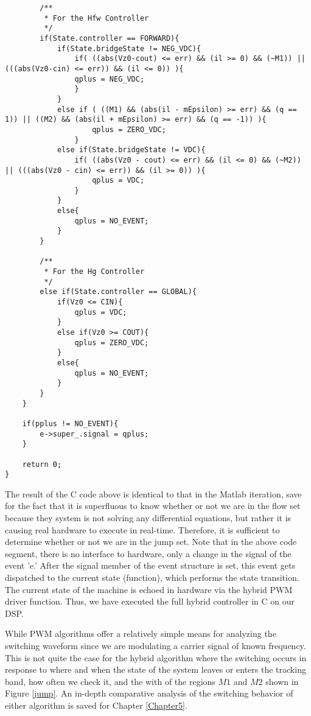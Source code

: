 \begin{lstlisting}
        /**
         * For the Hfw Controller
         */
        if(State.controller == FORWARD){    
            if(State.bridgeState != NEG_VDC){
                if( ((abs(Vz0-cout) <= err) && (il >= 0) && (~M1)) || (((abs(Vz0-cin) <= err)) && (il <= 0)) ){
                qplus = NEG_VDC;
                }
            }
            else if ( ((M1) && (abs(il - mEpsilon) >= err) && (q == 1)) || ((M2) && (abs(il + mEpsilon) >= err) && (q == -1)) ){
                    qplus = ZERO_VDC;
                }
            else if(State.bridgeState != VDC){
                if( ((abs(Vz0 - cout) <= err) && (il <= 0) && (~M2)) || (((abs(Vz0 - cin) <= err)) && (il >= 0)) ){
                    qplus = VDC;
                }
            }
            else{
                qplus = NO_EVENT;                
            }
        }

        /**
         * For the Hg Controller
         */
        else if(State.controller == GLOBAL){
            if(Vz0 <= CIN){
                qplus = VDC;
            }
            else if(Vz0 >= COUT){
                qplus = ZERO_VDC;
            }
            else{
                qplus = NO_EVENT;
            }
        }
    }

    if(pplus != NO_EVENT){
        e->super_.signal = qplus;
    }

    return 0;
}
\end{lstlisting}

The result of the C code above is identical to that in the Matlab iteration, save for the fact that it is superfluous to know whether or not we are in the flow set because they system is not solving any differential equations, but rather it is causing real hardware to execute in real-time.  Therefore, it is sufficient to determine whether or not we are in the jump set. Note that in the above code segment, there is no interface to hardware, only a change in the signal of the event 'e.' After the signal member of the event structure is set, this event gets dispatched to the current state (function), which performs the state transition. The current state of the machine is echoed in hardware via the hybrid PWM driver function. Thus, we have executed the full hybrid controller in C on our DSP. 

While PWM algorithms offer a relatively simple means for analyzing the switching waveform since we are modulating a carrier signal of known frequency. This is not quite the case for the hybrid algorithm where the switching occurs in response to where and when the state of the system leaves or enters the tracking band, how often we check it, and the with of the regions $M1$ and $M2$ shown in Figure \ref{jump}. An in-depth comparative analysis of the switching behavior of either algorithm is saved for Chapter \ref{Chapter5}.